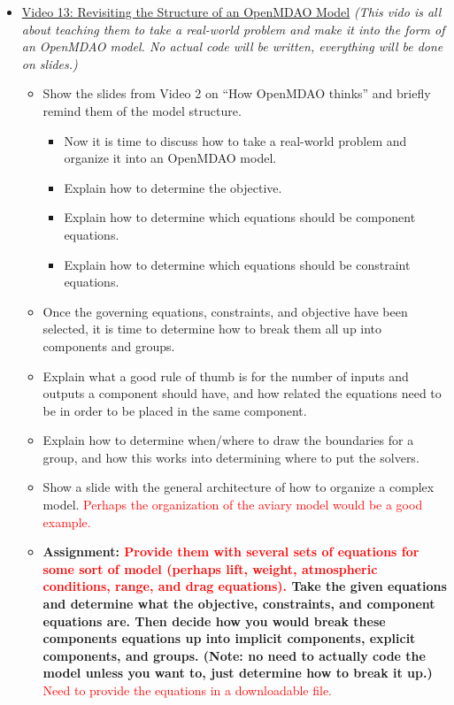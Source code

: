 \documentclass[12pt, letterpaper]{article}
\begin{document}
\begin{itemize}
	\item \underline{Video 13: Revisiting the Structure of an OpenMDAO Model} \textit{(This vido is all about teaching them to take a real-world problem and make it into the form of an OpenMDAO model. No actual code will be written, everything will be done on slides.)}
		\begin{itemize}
			\item Show the slides from Video 2 on “How OpenMDAO thinks” and briefly remind them of the model structure.
				\begin{itemize}
					\item Now it is time to discuss how to take a real-world problem and organize it into an OpenMDAO model.
					\item Explain how to determine the objective.
					\item Explain how to determine which equations should be component equations.
					\item Explain how to determine which equations should be constraint equations.
				\end{itemize}
			\item Once the governing equations, constraints, and objective have been selected, it is time to determine how to break them all up into components and groups.
			\item Explain what a good rule of thumb is for the number of inputs and outputs a component should have, and how related the equations need to be in order to be placed in the same component.
			\item Explain how to determine when/where to draw the boundaries for a group, and how this works into determining where to put the solvers.
			\item Show a slide with the general architecture of how to organize a complex model. \textcolor{red}{Perhaps the organization of the aviary model would be a good example.}
			\item \textbf{Assignment: \textcolor{red}{Provide them with several sets of equations for some sort of model (perhaps lift, weight, atmospheric conditions, range, and drag equations).} Take the given equations and determine what the objective, constraints, and component equations are. Then decide how you would break these components equations up into implicit components, explicit components, and groups. (Note: no need to actually code the model unless you want to, just determine how to break it up.)} \textcolor{red}{Need to provide the equations in a downloadable file.}
		\end{itemize}	
		

\end{itemize}
\end{document}

